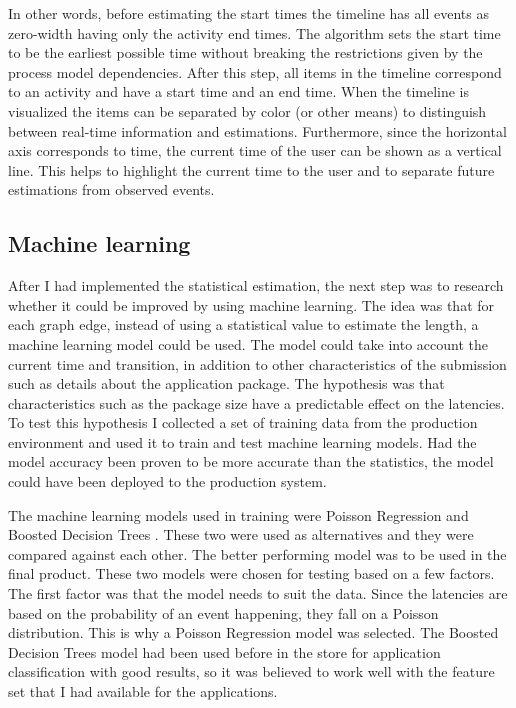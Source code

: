 In other words, before estimating the start times the timeline has all events as zero-width having only the activity end times. The algorithm sets the start time to be the earliest possible time without breaking the restrictions given by the process model dependencies.
After this step, all items in the timeline correspond to an activity and have a start time and an end time.
When the timeline is visualized the items can be separated by color (or other means) to distinguish between real-time information and estimations.
Furthermore, since the horizontal axis corresponds to time, the current time of the user can be shown as a vertical line.
This helps to highlight the current time to the user and to separate future estimations from observed events.


\subsection{Machine learning}
\label{sec:ml-estimation}

After I had implemented the statistical estimation, the next step was to research whether it could be improved by using machine learning. 
The idea was that for each graph edge, instead of using a statistical value to estimate the length, a machine learning model could be used.
The model could take into account the current time and transition, in addition to other characteristics of the submission such as details about the application package.
The hypothesis was that characteristics such as the package size have a predictable effect on the latencies.
To test this hypothesis I collected a set of training data from the production environment and used it to train and test machine learning models.
Had the model accuracy been proven to be more accurate than the statistics, the model could have been deployed to the production system.

The machine learning models used in training were Poisson Regression \cite{azurepoisson} and Boosted Decision Trees \cite{azurebdt}.
These two were used as alternatives and they were compared against each other.
The better performing model was to be used in the final product.
These two models were chosen for testing based on a few factors.
The first factor was that the model needs to suit the data.
Since the latencies are based on the probability of an event happening, they fall on a Poisson distribution. 
This is why a Poisson Regression model was selected.
The Boosted Decision Trees model had been used before in the store for application classification with good results, so it was believed to work well with the feature set that I had available for the applications.

